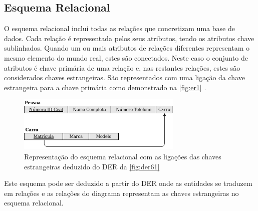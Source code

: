 \documentclass[11pt,twoside,a4paper]{report}
\begin{document}
\subsection{Esquema Relacional}
O esquema relacional incluí todas as relações que concretizam uma base de dados. Cada relação é representada pelos seus atributos, tendo os atributos chave sublinhados. Quando um ou mais atributos de relações diferentes representam o mesmo elemento do mundo real, estes são conectados. Neste caso o conjunto de atributos é chave primária de uma relação e, nas restantes relações, estes são considerados chaves estrangeiras. São representados com uma ligação da chave estrangeira para a chave primária como demonstrado na \autoref{fig:er1} \cite{Chen}.
\begin{figure}
	\begin{center}
		\includegraphics[width=0.7\textwidth]{notacao15} %
		\caption[Representação esquema relacional]{Representação do esquema relacional com as ligações das chaves estrangeiras deduzido do DER da \autoref{fig:der61}}
		\label{fig:er1}
	\end{center}
\end{figure}
Este esquema pode ser deduzido a partir do DER onde as entidades se traduzem em relações e as relações do diagrama representam as chaves estrangeiras no esquema relacional.
\end{document}
